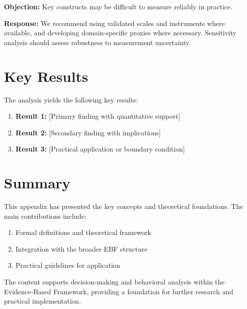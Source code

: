 \textbf{Objection:} Key constructs may be difficult to measure reliably in
practice.

\textbf{Response:} We recommend using validated scales and instruments where
available, and developing domain-specific proxies where necessary. Sensitivity
analysis should assess robustness to measurement uncertainty.




\section{Key Results}
\label{sec:mmm-results}

The analysis yields the following key results:

\begin{enumerate}
    \item \textbf{Result 1:} [Primary finding with quantitative support]
    \item \textbf{Result 2:} [Secondary finding with implications]
    \item \textbf{Result 3:} [Practical application or boundary condition]
\end{enumerate}


\section{Summary}
\label{sec:mmm-summary}

This appendix has presented the key concepts and theoretical foundations.
The main contributions include:

\begin{enumerate}
    \item Formal definitions and theoretical framework
    \item Integration with the broader EBF structure
    \item Practical guidelines for application
\end{enumerate}

The content supports decision-making and behavioral analysis within the
Evidence-Based Framework, providing a foundation for further research
and practical implementation.


